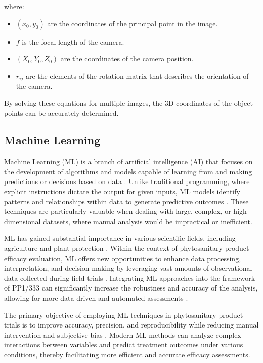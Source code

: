 \documentclass[12pt,a4paper,oneside]{report}
\begin{document}
where:
\begin{itemize}
    \item \( (x_0, y_0) \) are the coordinates of the principal point in the image.
    \item \( f \) is the focal length of the camera.
    \item \( (X_0, Y_0, Z_0) \) are the coordinates of the camera position.
    \item \( r_{ij} \) are the elements of the rotation matrix that describes the orientation of the camera.
\end{itemize}

By solving these equations for multiple images, the 3D coordinates of the object 
points can be accurately determined.


\subsection{Machine Learning}

Machine Learning (ML) is a branch of artificial intelligence (AI) that 
focuses on the development of algorithms and models capable of learning 
from and making predictions or decisions based on data \cite{Koza1996}. Unlike traditional 
programming, where explicit instructions dictate the output for given inputs, 
ML models identify patterns and relationships within data to generate 
predictive outcomes \cite{hastie_elements_2009}. These techniques are particularly valuable when 
dealing with large, complex, or high-dimensional datasets, where manual 
analysis would be impractical or inefficient.

ML has gained substantial importance in various scientific fields, including 
agriculture \cite{agronomy13122976} and plant protection \cite{bock_visual_2020}. Within the context of phytosanitary product 
efficacy evaluation, ML offers new opportunities to enhance data processing, 
interpretation, and decision-making by leveraging vast amounts of observational 
data collected during field trials \cite{bock_phytopathometry_2022}. Integrating ML approaches into the framework 
of PP1/333 can significantly increase the robustness and accuracy of the analysis, 
allowing for more data-driven and automated assessments \cite{barbedo_automatic_2014,arnal_barbedo_digital_2013,bock_plant_2010}.

The primary objective of employing ML techniques in phytosanitary product trials 
is to improve accuracy, precision, and reproducibility while reducing manual 
intervention and subjective bias \cite{bock_visual_2020}. Modern ML methods can analyze complex interactions 
between variables and predict treatment outcomes under various conditions, thereby 
facilitating more efficient and accurate efficacy assessments.
\end{document}
